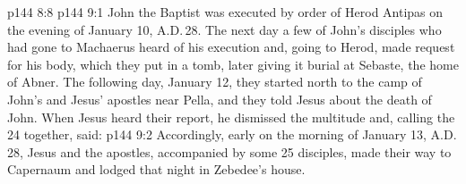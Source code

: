 \vs p144 8:8 
\vs p144 9:1 John the Baptist was executed by order of Herod Antipas on the evening of January 10, A.D.\,28. The next day a few of John’s disciples who had gone to Machaerus heard of his execution and, going to Herod, made request for his body, which they put in a tomb, later giving it burial at Sebaste, the home of Abner. The following day, January 12, they started north to the camp of John’s and Jesus’ apostles near Pella, and they told Jesus about the death of John. When Jesus heard their report, he dismissed the multitude and, calling the 24 together, said: 
\vs p144 9:2 Accordingly, early on the morning of January 13, A.D.\,28, Jesus and the apostles, accompanied by some 25 disciples, made their way to Capernaum and lodged that night in Zebedee’s house.
